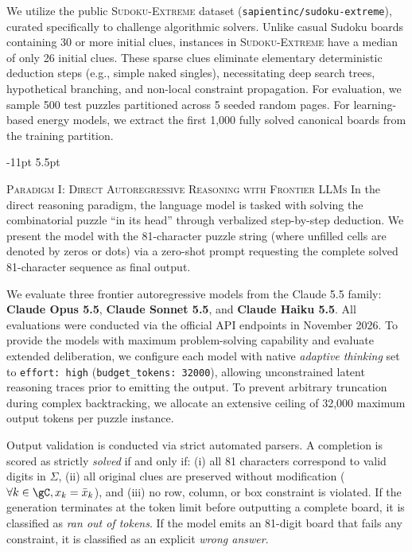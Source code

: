 \documentclass{article} %
\makeatletter
\renewcommand\subsection{\@startsection{subsection}{2}{\z@}%
  {-11pt \@plus -3pt \@minus -2pt}%
  {5.5pt \@plus 2pt}%
  {\normalfont\fontsize{10}{12}\selectfont\scshape\raggedright}}
\makeatother
\begin{document}
We utilize the public \textsc{Sudoku-Extreme} dataset (\texttt{sapientinc/sudoku-extreme}), curated specifically to challenge algorithmic solvers. Unlike casual Sudoku boards containing 30 or more initial clues, instances in \textsc{Sudoku-Extreme} have a median of only 26 initial clues. These sparse clues eliminate elementary deterministic deduction steps (e.g., simple naked singles), necessitating deep search trees, hypothetical branching, and non-local constraint propagation. For evaluation, we sample 500 test puzzles partitioned across 5 seeded random pages. For learning-based energy models, we extract the first 1,000 fully solved canonical boards from the training partition.

\subsection{\textsc{Paradigm I: Direct Autoregressive Reasoning with Frontier LLMs}}
\label{sec:method_paradigm1}
In the direct reasoning paradigm, the language model is tasked with solving the combinatorial puzzle ``in its head'' through verbalized step-by-step deduction. We present the model with the 81-character puzzle string (where unfilled cells are denoted by zeros or dots) via a zero-shot prompt requesting the complete solved 81-character sequence as final output.

We evaluate three frontier autoregressive models from the Claude 5.5 family: \textbf{Claude Opus 5.5}, \textbf{Claude Sonnet 5.5}, and \textbf{Claude Haiku 5.5}. All evaluations were conducted via the official API endpoints in November 2026. To provide the models with maximum problem-solving capability and evaluate extended deliberation, we configure each model with native \textit{adaptive thinking} set to \texttt{effort: high} (\texttt{budget\_tokens: 32000}), allowing unconstrained latent reasoning traces prior to emitting the output. To prevent arbitrary truncation during complex backtracking, we allocate an extensive ceiling of 32,000 maximum output tokens per puzzle instance.

Output validation is conducted via strict automated parsers. A completion is scored as strictly \textit{solved} if and only if: (i) all 81 characters correspond to valid digits in $\Sigma$, (ii) all original clues are preserved without modification ($\forall k \in \gC, x_k = \bar{x}_k$), and (iii) no row, column, or box constraint is violated. If the generation terminates at the token limit before outputting a complete board, it is classified as \textit{ran out of tokens}. If the model emits an 81-digit board that fails any constraint, it is classified as an explicit \textit{wrong answer}.
\end{document}
